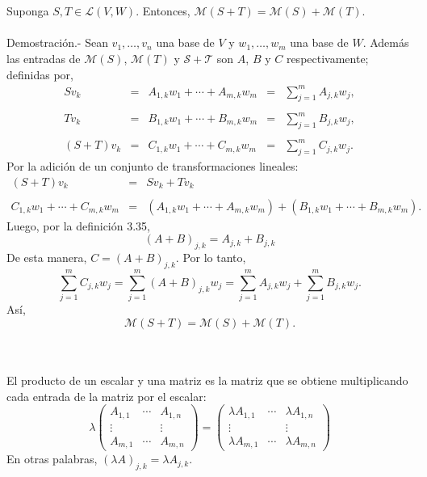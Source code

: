 \begin{myteo}\;\\\\
    Suponga $S,T\in \mathcal{L}(V,W)$. Entonces, $\mathcal{M}(S+T)=\mathcal{M}(S)+\mathcal{M}(T)$.\\\\
    Demostración.-\; Sean $v_1,\ldots, v_n$ una base de $V$ y $w_1,\ldots,w_m$ una base de $W$. Además las entradas de $\mathcal{M}(S)$, $\mathcal{M}(T)$ y $\mathcal{S+T}$ son $A$, $B$ y $C$ respectivamente; definidas por,
    $$
    \begin{array}{rcccl}
	Sv_k&=&A_{1,k}w_1+\cdots+A_{m,k}w_m&=&\displaystyle\sum_{j=1}^m A_{j,k}w_j,\\\\
	Tv_k&=&B_{1,k}w_1+\cdots+B_{m,k}w_m&=&\displaystyle\sum_{j=1}^m B_{j,k}w_j,\\\\
	(S+T)v_k&=&C_{1,k}w_1+\cdots+C_{m,k}w_m&=&\displaystyle\sum_{j=1}^m C_{j,k}w_j.
    \end{array}
    $$
    Por la adición de un conjunto de transformaciones lineales:
    $$
    \begin{array}{rcl}
	(S+T)v_k&=& Sv_k+Tv_k\\\\
	C_{1,k}w_1+\cdots + C_{m,k}w_m&=&\left(A_{1,k}w_1+\cdots +A_{m,k}w_m\right)+\left(B_{1,k}w_1+\cdots +B_{m,k}w_m\right).
    \end{array}
    $$
    Luego, por la definición 3.35, 
    $$(A+B)_{j,k}=A_{j,k}+B_{j,k}$$
    De esta manera, $C=(A+B)_{j,k}$. Por lo tanto,
    $$\sum_{j=1}^m C_{j,k}w_j=\sum_{j=1}^m (A+B)_{j,k}w_j=\sum_{j=1}^m A_{j,k}w_j+\sum_{j=1}^m B_{j,k}w_j.$$
    Así,
    $$\mathcal{M}(S+T)=\mathcal{M}(S)+\mathcal{M}(T).$$
\end{myteo}

\begin{mydef}\;\\\\
    El producto de un escalar y una matriz es la matriz que se obtiene multiplicando cada entrada de la matriz por el escalar:
    $$
    \lambda
	\begin{pmatrix}
	    A_{1,1}&\cdots&A_{1,n}\\
	    \vdots&&\vdots\\
	    A_{m,1}&\cdots&A_{m,n}
	\end{pmatrix}
	=
	\begin{pmatrix}
	    \lambda A_{1,1}&\cdots&\lambda A_{1,n}\\
	    \vdots&&\vdots\\
	    \lambda A_{m,1}&\cdots&\lambda A_{m,n}
	\end{pmatrix}
    $$
    En otras palabras, $(\lambda A)_{j,k}=\lambda A_{j,k}$.
\end{mydef}

